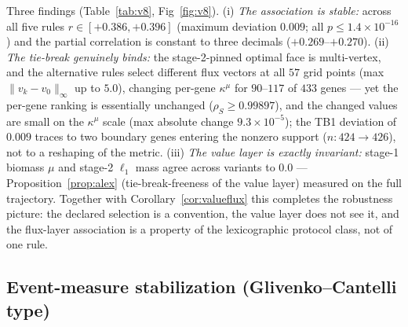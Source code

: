 \documentclass[11pt,a4paper]{article}
\theoremstyle{plain}
\theoremstyle{definition}
\theoremstyle{remark}
\newcommand{\kmu}{\kappa^{\mu}}
\begin{document}
Three findings (Table~\ref{tab:v8}, Fig~\ref{fig:v8}). (i) \emph{The association is
stable:} across all five rules $r \in [+0.386, +0.396]$ (maximum
deviation $0.009$; all $p \le 1.4 \times 10^{-16}$) and the partial
correlation is constant to three decimals ($+0.269$--$+0.270$). (ii)
\emph{The tie-break genuinely binds:} the stage-2-pinned optimal face
is multi-vertex, and the alternative rules select different flux
vectors at all $57$ grid points (max $\|v_k - v_0\|_\infty$ up to
$5.0$), changing per-gene $\kmu$ for $90$--$117$ of $433$ genes ---
yet the per-gene ranking is essentially unchanged
($\rho_S \ge 0.99897$), and the changed values are small on the
$\kmu$ scale (max absolute change $9.3 \times 10^{-5}$); the TB1
deviation of $0.009$ traces to two boundary genes entering the
nonzero support ($n: 424 \to 426$), not to a reshaping of the metric.
(iii) \emph{The value layer is exactly invariant:} stage-1 biomass
$\mu$ and stage-2 $\ell_1$ mass agree across variants to $0.0$ ---
Proposition~\ref{prop:alex} (tie-break-freeness of the value layer)
measured on the full trajectory. Together with
Corollary~\ref{cor:valueflux} this completes the robustness picture: the
declared selection is a convention, the value layer does not see it,
and the flux-layer association is a property of the lexicographic
protocol class, not of one rule.

\subsection{Event-measure stabilization
(Glivenko--Cantelli type)}\label{sec:e32}
\end{document}
